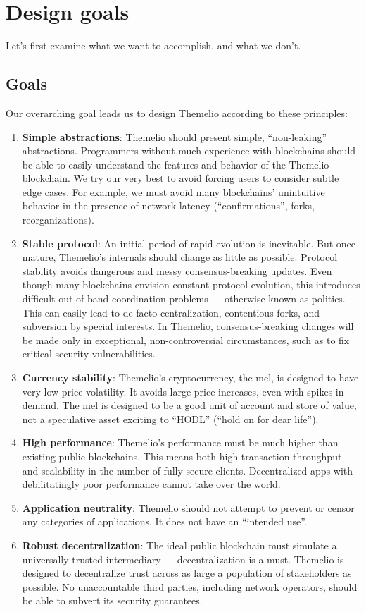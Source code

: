 \documentclass[headinclude,12pt]{scrbook}
\begin{document}
\section{Design goals}

Let's first examine what we want to accomplish, and what we don't.

\subsection{Goals}

Our overarching goal leads us to design Themelio according to these principles:

\begin{enumerate}
    \item \textbf{Simple abstractions}: Themelio should present simple, ``non-leaking'' abstractions. Programmers without much experience with blockchains should be able to easily understand the features and behavior of the Themelio blockchain. We try our very best to avoid forcing users to consider subtle edge cases. For example, we must avoid many blockchains' unintuitive behavior in the presence of network latency (``confirmations'', forks, reorganizations).
    \item \textbf{Stable protocol}: An initial period of rapid evolution is inevitable. But once mature, Themelio's internals should change as little as possible. Protocol stability avoids dangerous and messy consensus-breaking updates. Even though many blockchains envision constant protocol evolution, this introduces difficult out-of-band coordination problems --- otherwise known as politics.  This can easily lead to de-facto centralization, contentious forks, and subversion by special interests. In Themelio, consensus-breaking changes will be made only in exceptional, non-controversial circumstances, such as to fix critical security vulnerabilities.
    \item \textbf{Currency stability}: Themelio's cryptocurrency, the mel, is designed to have very low price volatility. It avoids large price increases, even with spikes in demand. The mel is designed to be a good unit of account and store of value, not a speculative asset exciting to ``HODL'' (``hold on for dear life'').
    \item \textbf{High performance}: Themelio's performance must be much higher than existing public blockchains. This means both high transaction throughput and scalability in the number of fully secure clients. Decentralized apps with debilitatingly poor performance cannot take over the world.
    \item \textbf{Application neutrality}: Themelio should not attempt to prevent or censor any categories of applications. It does not have an ``intended use''.
    \item \textbf{Robust decentralization}: The ideal public blockchain must simulate a universally trusted intermediary --- decentralization is a must. Themelio is designed to decentralize trust across as large a population of stakeholders as possible. No unaccountable third parties, including network operators, should be able to subvert its security guarantees.
\end{enumerate}
\end{document}
